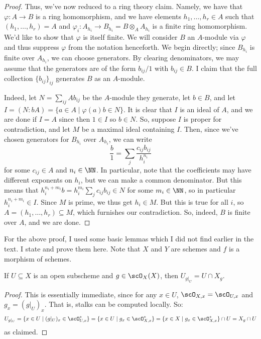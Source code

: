 \begin{proof}
	Thus, we've now reduced to a ring theory claim. Namely, we have that $\varphi : A \to B$ is a ring homomorphism, and we have elements $h_1,\ldots,h_r \in A$ such that $(h_1,\ldots,h_r) = A$ and $\varphi_i : A_{h_i} \to B_{h_i} = B \otimes_A A_{h_i}$ is a finite ring homomorphism. We'd like to show that $\varphi$ is itself finite. We will consider $B$ an $A$-module via $\varphi$ and thus suppress $\varphi$ from the notation henceforth. We begin directly; since $B_{h_i}$ is finite over $A_{h_i}$, we can choose generators. By clearing denominators, we may assume that the generators are of the form $b_{ij}/1$ with $b_{ij} \in B$. I claim that the full collection $\{b_{ij}\}_{ij}$ generates $B$ as an $A$-module.
	
	Indeed, let $N = \sum_{ij} Ab_{ij}$ be the $A$-module they generate, let $b \in B$, and let $I = (N : bA) = \{ a \in A \mid \varphi(a)b \in N \}$. It is clear that $I$ is an ideal of $A$, and we are done if $I = A$ since then $1 \in I$ so $b \in N$. So, suppose $I$ is proper for contradiction, and let $M$ be a maximal ideal containing $I$. Then, since we've chosen generators for $B_{h_i}$ over $A_{h_i}$, we can write
	\[ \frac{b}{1} = \sum_j \frac{c_{ij}b_{ij}}{h_i^{n_i}} \]
	for some $c_{ij} \in A$ and $n_i \in \NN$. In particular, note that the coefficients may have different exponents on $h_i$, but we can make a common denominator. But this means that $h_i^{n_i+m_i}b = h_i^{m_i}\sum_j c_{ij}b_{ij} \in N$ for some $m_i \in \NN$, so in particular $h_i^{n_i+m_i} \in I$. Since $M$ is prime, we thus get $h_i \in M$. But this is true for all $i$, so $A = (h_1,\ldots,h_r) \subseteq M$, which furnishes our contradiction. So, indeed, $B$ is finite over $A$, and we are done.
\end{proof}

For the above proof, I used some basic lemmas which I did not find earlier in the text. I state and prove them here. Note that $X$ and $Y$ are schemes and $f$ is a morphism of schemes.

\begin{lem} If $U \subseteq X$ is an open subscheme and $g \in \scO_X(X)$, then $U_{g|_U} = U \cap X_g$. \end{lem}
\begin{proof}
	This is essentially immediate, since for any $x \in U$, $\scO_{X,x} = \scO_{U,x}$ and $g_x = (g|_U)_x$. That is, stalks can be computed locally. So:
	\[ U_{g|_U} = \{x \in U \mid (g|_U)_x \in \scO_{U,x}^\ast\} = \{x \in U \mid g_x \in \scO_{X,x}^\ast \} = \{x \in X \mid g_x \in \scO_{X,x}^\ast\} \cap U = X_g \cap U \]
	as claimed.
\end{proof}

